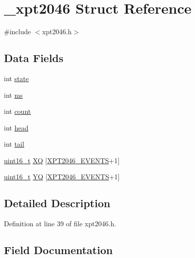 \hypertarget{struct__xpt2046}{}\section{\+\_\+xpt2046 Struct Reference}
\label{struct__xpt2046}


{\ttfamily \#include $<$xpt2046.\+h$>$}

\subsection*{Data Fields}
\begin{DoxyCompactItemize}
\item 
int \hyperlink{struct__xpt2046_a271e59b1fe899e8d1199f617bd381b15}{state}
\item 
int \hyperlink{struct__xpt2046_a7ada38c703d34310580fbdb4625a5190}{ms}
\item 
int \hyperlink{struct__xpt2046_affdd5680717fb00e5f975c0472ed32f1}{count}
\item 
int \hyperlink{struct__xpt2046_a8b4e70a2d7a60543902ac8648c986a31}{head}
\item 
int \hyperlink{struct__xpt2046_a22287733194e6d32116347f39f77523f}{tail}
\item 
\hyperlink{send_8c_a273cf69d639a59973b6019625df33e30}{uint16\+\_\+t} \hyperlink{struct__xpt2046_ac3f7953dda5a05a52276892bee461a29}{XQ} \mbox{[}\hyperlink{xpt2046_8h_abce5dd412f3f040208dab108718fb875}{X\+P\+T2046\+\_\+\+E\+V\+E\+N\+TS}+1\mbox{]}
\item 
\hyperlink{send_8c_a273cf69d639a59973b6019625df33e30}{uint16\+\_\+t} \hyperlink{struct__xpt2046_a0a1b0401066322d653135eb8db55d198}{YQ} \mbox{[}\hyperlink{xpt2046_8h_abce5dd412f3f040208dab108718fb875}{X\+P\+T2046\+\_\+\+E\+V\+E\+N\+TS}+1\mbox{]}
\end{DoxyCompactItemize}


\subsection{Detailed Description}


Definition at line 39 of file xpt2046.\+h.



\subsection{Field Documentation}
